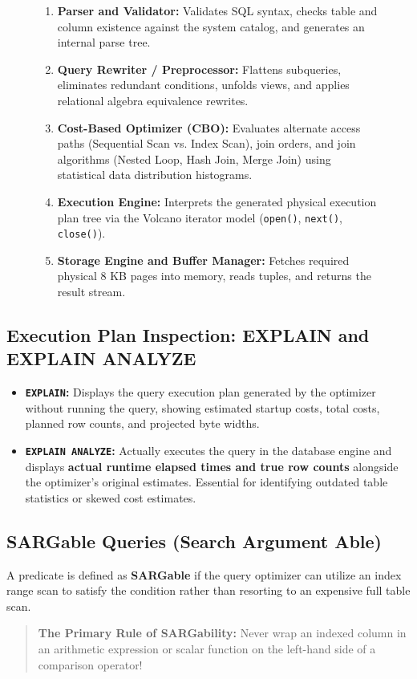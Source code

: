 \begin{figure}[htbp]
\centering
\begin{tcolorbox}[colback=codebg, colframe=primary, title=\textbf{The 5-Stage Query Processing Pipeline}]
\begin{enumerate}
    \item \textbf{Parser and Validator:} Validates SQL syntax, checks table and column existence against the system catalog, and generates an internal parse tree.
    \item \textbf{Query Rewriter / Preprocessor:} Flattens subqueries, eliminates redundant conditions, unfolds views, and applies relational algebra equivalence rewrites.
    \item \textbf{Cost-Based Optimizer (CBO):} Evaluates alternate access paths (Sequential Scan vs. Index Scan), join orders, and join algorithms (Nested Loop, Hash Join, Merge Join) using statistical data distribution histograms.
    \item \textbf{Execution Engine:} Interprets the generated physical execution plan tree via the Volcano iterator model (\texttt{open()}, \texttt{next()}, \texttt{close()}).
    \item \textbf{Storage Engine and Buffer Manager:} Fetches required physical 8 KB pages into memory, reads tuples, and returns the result stream.
\end{enumerate}
\end{tcolorbox}
\end{figure}

\subsection{Execution Plan Inspection: EXPLAIN and EXPLAIN ANALYZE}
\begin{itemize}
    \item \textbf{\texttt{EXPLAIN}:} Displays the query execution plan generated by the optimizer without running the query, showing estimated startup costs, total costs, planned row counts, and projected byte widths.
    \item \textbf{\texttt{EXPLAIN ANALYZE}:} Actually executes the query in the database engine and displays \textbf{actual runtime elapsed times and true row counts} alongside the optimizer's original estimates. Essential for identifying outdated table statistics or skewed cost estimates.
\end{itemize}

\subsection{SARGable Queries (Search Argument Able)}
A predicate is defined as \textbf{SARGable} if the query optimizer can utilize an index range scan to satisfy the condition rather than resorting to an expensive full table scan.
\begin{quote}
\textbf{The Primary Rule of SARGability:} Never wrap an indexed column in an arithmetic expression or scalar function on the left-hand side of a comparison operator!
\end{quote}


